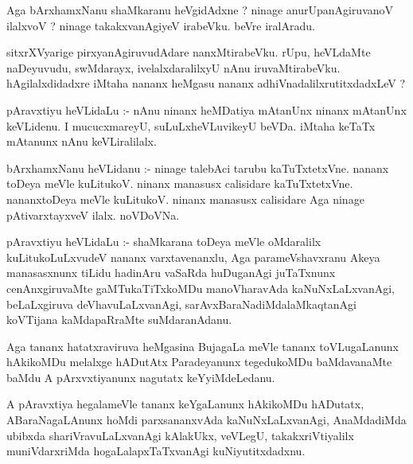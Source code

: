 \documentclass{article}
\begin{document}
\begin{mn}
Aga  bArxhamxNanu  shaMkaranu  heVgidAdxne ?  ninage  anurUpanAgiruvanoV  ilalxvoV ?  ninage  
takakxvanAgiyeV  irabeVku.  beVre  iralAradu.
\end{mn}

\begin{mn}
sitxrXVyarige  pirxyanAgiruvudAdare  nanxMtirabeVku.  rUpu,  heVLdaMte  naDeyuvudu,  swMdarayx,  ivelalxdaralilxyU  
nAnu  iruvaMtirabeVku.  hAgilalxdidadxre  iMtaha  nananx  heMgasu  nananx  adhiVnadalilxrutitxdadxLeV ?
\end{mn}

\begin{mn}
pAravxtiyu  heVLidaLu :- nAnu  ninanx  heMDatiya  mAtanUnx  ninanx  mAtanUnx  keVLidenu.  I  mucucxmareyU,  
suLuLxheVLuvikeyU  beVDa.  iMtaha  keTaTx  mAtanunx  nAnu  keVLiralilalx.
\end{mn}

\begin{mn}
bArxhamxNanu  heVLidanu :- ninage  talebAci  tarubu  kaTuTxtetxVne.  nananx  toDeya  meVle  kuLitukoV.  
ninanx  manasusx  calisidare  kaTuTxtetxVne.  nananxtoDeya  meVle  kuLitukoV.  ninanx  manasusx  
calisidare  Aga  ninage  pAtivarxtayxveV  ilalx.  noVDoVNa. 
\end{mn}

\begin{mn}
pAravxtiyu  heVLidaLu :-  shaMkarana  toDeya  meVle  oMdaralilx  kuLitukoLuLxvudeV  nananx  varxtavenanxlu,  
Aga  parameVshavxranu  Akeya  manasasxnunx  tiLidu  hadinAru  vaSaRda  huDuganAgi  juTaTxnunx  cenAnxgiruvaMte  
gaMTukaTiTxkoMDu  manoVharavAda  kaNuNxLaLxvanAgi,  beLaLxgiruva  deVhavuLaLxvanAgi,  sarAvxBaraNadiMdalaMkaqtanAgi  
koVTijana  kaMdapaRraMte  suMdaranAdanu. 
\end{mn}

\begin{mn}
Aga  tananx  hatatxraviruva  heMgasina  BujagaLa  meVle  tananx  toVLugaLanunx  hAkikoMDu  melalxge  
hADutAtx  Paradeyanunx  tegedukoMDu  baMdavanaMte  baMdu  A  pArxvxtiyanunx  nagutatx  keYyiMdeLedanu.
\end{mn}

\begin{mn}
A  pAravxtiya  hegalameVle  tananx  keYgaLanunx  hAkikoMDu  hADutatx,  ABaraNagaLAnunx  hoMdi  
parxsananxvAda  kaNuNxLaLxvanAgi,  AnaMdadiMda  ubibxda  shariVravuLaLxvanAgi  kAlakUkx,  veVLegU,  
takakxriVtiyalilx  muniVdarxriMda  hogaLalapxTaTxvanAgi  kuNiyutitxdadxnu.
\end{mn}
\end{document}
